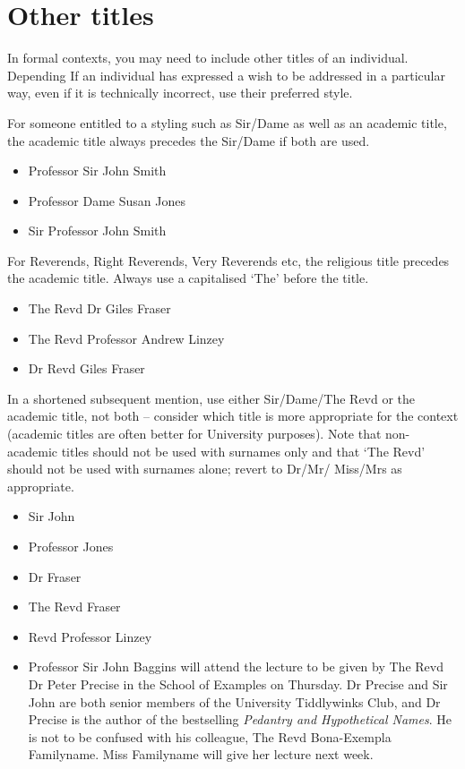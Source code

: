 \documentclass[11pt,a4paper]{book}
\newcommand{\xmark}{{\color{cadmiumred}\ding{54}}}%
\newcommand{\cmark}{{\color{green(html/cssgreen)}\checkmark}}%
\begin{document}
	\section{Other titles}
	In formal contexts, you may need to include other titles of an individual. Depending If an individual has expressed a wish to be addressed in a particular way, even if it is technically incorrect, use their preferred style.\par
	\newpage
	For someone entitled to a styling such as Sir/Dame as well as an academic title, the academic title always precedes the Sir/Dame if both are used.
	{\firasans \begin{mdframed}[backgroundcolor=aliceblue] \begin{itemize}[label=\cmark]
		\item Professor Sir John Smith
		\item Professor Dame Susan Jones
		\item[\xmark] Sir Professor John Smith
	\end{itemize} \end{mdframed} }
	For Reverends, Right Reverends, Very Reverends etc, the religious title precedes the academic title. Always use a capitalised `The' before the title.
	{\firasans \begin{mdframed}[backgroundcolor=aliceblue] \begin{itemize}[label=\cmark]
		\item The Revd Dr Giles Fraser
		\item The Revd Professor Andrew Linzey
		\item[\xmark] Dr Revd Giles Fraser
	\end{itemize} \end{mdframed} }
	In a shortened subsequent mention, use either Sir/Dame/The Revd or the academic title, not both -- consider which title is more appropriate for the context (academic titles are often better for University purposes). Note that non-academic titles should not be used with surnames only and that `The Revd' should not be used with surnames alone; revert to Dr/Mr/ Miss/Mrs as appropriate.
	{\firasans \begin{mdframed}[backgroundcolor=aliceblue] \begin{itemize}[label=\cmark]
		\item Sir John
		\item Professor Jones
		\item Dr Fraser
		\item[\xmark] The Revd Fraser
		\item[\xmark] Revd Professor Linzey
		\item Professor Sir John Baggins will attend the lecture to be given by The Revd Dr Peter Precise in the School of Examples on Thursday. Dr Precise and Sir John are both senior members of the University Tiddlywinks Club, and Dr Precise is the author of the bestselling \textit{Pedantry and Hypothetical Names}. He is not to be confused with his colleague, The Revd Bona-Exempla Familyname. Miss Familyname will give her lecture next week.
	\end{itemize} \end{mdframed} }
\end{document}
